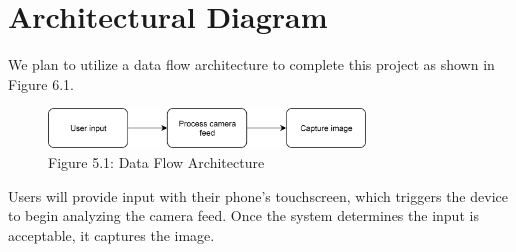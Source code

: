 \chapter{Architectural Diagram}

We plan to utilize a data flow architecture to complete this project as shown in Figure 6.1.

\begin{figure}[!h]
    \centering
    \includegraphics[width=0.75\textwidth]{architecturediagram}
    \caption{Figure 5.1: Data Flow Architecture}
    \label{fig:architecturediagram}
\end{figure}

Users will provide input with their phone's touchscreen, which triggers the device to begin analyzing the camera feed. Once the system determines the input is acceptable, it captures the image.

